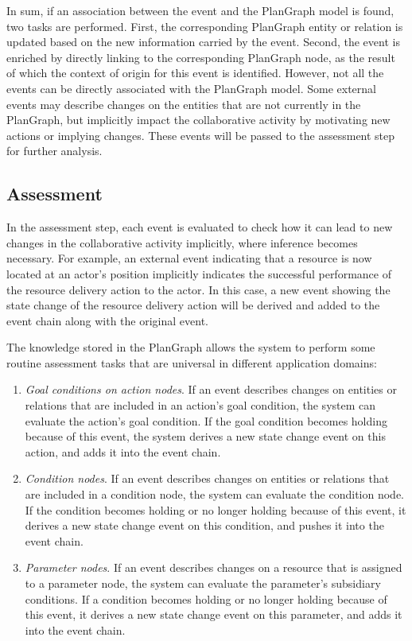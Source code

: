 In sum, if an association between the event and the PlanGraph model is found, two tasks are performed. First, the corresponding PlanGraph entity or relation is updated based on the new information carried by the event. Second, the event is enriched by directly linking to the corresponding PlanGraph node, as the result of which the context of origin for this event is identified. However, not all the events can be directly associated with the PlanGraph model. Some external events may describe changes on the entities that are not currently in the PlanGraph, but implicitly impact the collaborative activity by motivating new actions or implying changes. These events will be passed to the assessment step for further analysis. 

\subsection{Assessment} %
\label{sub:assessment}
In the assessment step, each event is evaluated to check how it can lead to new changes in the collaborative activity implicitly, where inference becomes necessary. For example, an external event indicating that a resource is now located at an actor's position implicitly indicates the successful performance of the resource delivery action to the actor. In this case, a new event showing the state change of the resource delivery action will be derived and added to the event chain along with the original event.

The knowledge stored in the PlanGraph allows the system to perform some routine assessment tasks that are universal in different application domains:
\begin{enumerate}
	\item \emph{Goal conditions on action nodes}. If an event describes changes on entities or relations that are included in an action's goal condition, the system can evaluate the action's goal condition. If the goal condition becomes holding because of this event, the system derives a new state change event on this action, and adds it into the event chain.
	\item \emph{Condition nodes}. If an event describes changes on entities or relations that are included in a condition node, the system can evaluate the condition node. If the condition becomes holding or no longer holding because of this event, it derives a new state change event on this condition, and pushes it into the event chain. 
	\item \emph{Parameter nodes}. If an event describes changes on a resource that is assigned to a parameter node, the system can evaluate the parameter's subsidiary conditions. If a  condition becomes holding or no longer holding because of this event, it derives a new state change event on this parameter, and adds it into the event chain.
\end{enumerate}

